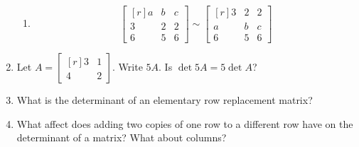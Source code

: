 \documentclass[12pt]{article}
\begin{document}
\begin{multicols*}{2}
\begin{enumerate}
\begin{enumerate}
		\item \[
		\begin{bmatrix*}[r]
			a & b & c\\
			3 & 2 & 2\\
			6 & 5 & 6
		\end{bmatrix*}\sim \begin{bmatrix*}[r]
			3 & 2 & 2\\
			a & b & c\\
			6 & 5 & 6
		\end{bmatrix*}
		\]
		\vfill
		\end{enumerate}

		\item Let $A = \begin{bmatrix*}[r]
			3 & 1\\
			4 & 2
		\end{bmatrix*}$. Write $5A$. Is $\det 5A = 5 \det A$?
		\vfill\null\columnbreak

		\item What is the determinant of an elementary row replacement matrix?

		\vfill

		\item What affect does adding two copies of one row to a different row have on the determinant of a matrix? What about columns?
		\vfill
	\end{enumerate}
\end{multicols*}
\end{document}
